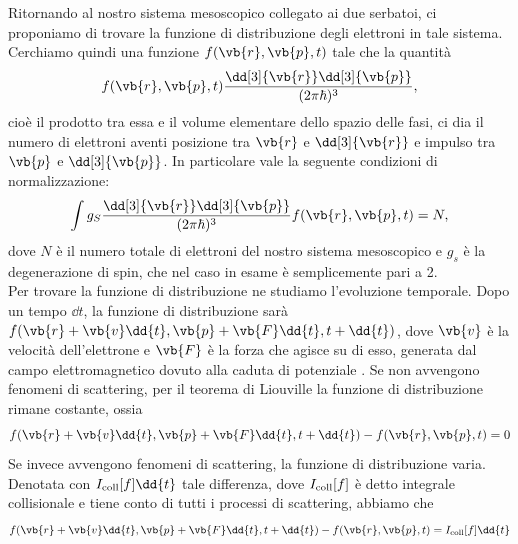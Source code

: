 Ritornando al nostro sistema mesoscopico collegato ai due serbatoi, ci proponiamo di trovare la funzione di distribuzione degli elettroni in tale sistema.\\
Cerchiamo quindi una funzione $f(\vb{r},\vb{p},t)$ tale che la quantità
\begin{equation*}
    f(\vb{r},\vb{p},t) \frac{\dd[3]{\vb{r}} \dd[3]{\vb{p}}}{(2 \pi \hbar)^3},
\end{equation*}
cioè il prodotto tra essa e il volume elementare dello spazio delle fasi, ci dia il numero di elettroni aventi posizione tra $\vb{r}$ e $\dd[3]{\vb{r}}$ e impulso tra $\vb{p}$ e $\dd[3]{\vb{p}}$. In particolare vale la seguente condizioni di normalizzazione:
\begin{equation}
    \int g_S\frac{\dd[3]{\vb{r}}\dd[3]{\vb{p}}}{(2\pi \hbar)^3} f(\vb{r},\vb{p},t) = N,
\end{equation}
dove $N$ è il numero totale di elettroni del nostro sistema mesoscopico e $g_s$ è la degenerazione di spin, che nel caso in esame è semplicemente pari a 2.\\
Per trovare la funzione di distribuzione ne studiamo l'evoluzione temporale. Dopo un tempo $\dd{t}$, la funzione di distribuzione sarà $f(\vb{r} + \vb{v} \dd{t}, \vb{p} + \vb{F} \dd{t}, t + \dd{t})$, dove $\vb{v}$ è la velocità dell'elettrone e $\vb{F}$ è la forza che agisce su di esso, generata dal campo elettromagnetico dovuto alla caduta di potenziale
. Se non avvengono fenomeni di scattering, per il teorema di Liouville la funzione di distribuzione rimane costante, ossia
\begin{equation*}
    f(\vb{r} + \vb{v} \dd{t}, \vb{p} + \vb{F} \dd{t}, t + \dd{t}) - f(\vb{r}, \vb{p}, t)
    =0
\end{equation*}
Se invece avvengono fenomeni di scattering, la funzione di distribuzione varia. Denotata con $I_{\rm coll}[f] \dd{t}$ tale differenza, dove $I_{\rm coll}[f]$ è detto integrale collisionale e tiene conto di tutti i processi di scattering, abbiamo che
\begin{equation}
    f(\vb{r} + \vb{v} \dd{t}, \vb{p} + \vb{F} \dd{t}, t + \dd{t}) - f(\vb{r}, \vb{p}, t)
    =I_{\rm coll}[f] \dd{t}
    \label{eq:differenza_funzione_distribuzione_con_collisioni}
\end{equation}
